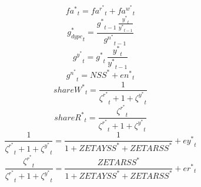 \begin{dmath}
{{fa^*}}_{t}={{fa^r^*}}_{t}+{{fa^w^*}}_{t}
\end{dmath}
\begin{dmath}
{{g_{dypc}^*}}_{t}=\frac{{{g^*}}_{t-1}\, \frac{{{y^*}}_{t}}{{{y^*}}_{t-1}}}{{{g^n^*}}_{t-1}}
\end{dmath}
\begin{dmath}
{{g^y^*}}_{t}={{g^*}}_{t}\, \frac{{{y^*}}_{t}}{{{y^*}}_{t-1}}
\end{dmath}
\begin{dmath}
{{g^n^*}}_{t}={{NSS^*}}+{{en^*}}_{t}
\end{dmath}
\begin{dmath}
{{shareW^*}}_{t}=\frac{1}{{{\zeta^r^*}}_{t}+1+{{\zeta^y^*}}_{t}}
\end{dmath}
\begin{dmath}
{{shareR^*}}_{t}=\frac{{{\zeta^r^*}}_{t}}{{{\zeta^r^*}}_{t}+1+{{\zeta^y^*}}_{t}}
\end{dmath}
\begin{dmath}
\frac{1}{{{\zeta^r^*}}_{t}+1+{{\zeta^y^*}}_{t}}=\frac{1}{1+{{ZETAYSS^*}}+{{ZETARSS^*}}}+{{ey^*}}_{t}
\end{dmath}
\begin{dmath}
\frac{{{\zeta^r^*}}_{t}}{{{\zeta^r^*}}_{t}+1+{{\zeta^y^*}}_{t}}=\frac{{{ZETARSS^*}}}{1+{{ZETAYSS^*}}+{{ZETARSS^*}}}+{{er^*}}_{t}
\end{dmath}
